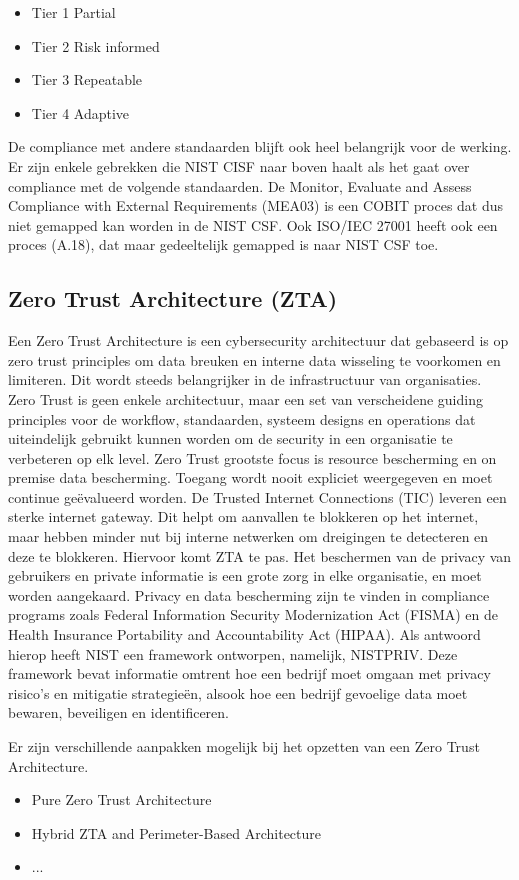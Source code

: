 \begin{itemize}
    \item Tier 1 Partial
    \item Tier 2 Risk informed
    \item Tier 3 Repeatable
    \item Tier 4 Adaptive
\end{itemize} 

De compliance met andere standaarden blijft ook heel belangrijk voor de werking. Er zijn enkele gebrekken die NIST CISF naar boven haalt als het gaat over compliance met de volgende standaarden.
De Monitor, Evaluate and Assess Compliance with External Requirements (MEA03) is een COBIT proces dat dus niet gemapped kan worden in de NIST CSF.
Ook ISO/IEC 27001 heeft ook een proces (A.18), dat maar gedeeltelijk gemapped is naar NIST CSF toe.



\subsection{Zero Trust Architecture (ZTA)}

Een Zero Trust Architecture is een cybersecurity architectuur dat gebaseerd is op zero trust principles om data breuken en interne data wisseling te voorkomen en limiteren.
Dit wordt steeds belangrijker in de infrastructuur van organisaties. Zero Trust is geen enkele architectuur, maar een set van verscheidene guiding principles voor de workflow, standaarden, systeem designs en operations dat uiteindelijk gebruikt kunnen worden om de security in een organisatie te verbeteren op elk level.
Zero Trust grootste focus is resource bescherming en on premise data bescherming. Toegang wordt nooit expliciet weergegeven en moet continue geëvalueerd worden.
De Trusted Internet Connections (TIC) leveren een sterke internet gateway. Dit helpt om aanvallen te blokkeren op het internet, maar hebben minder nut bij interne netwerken om dreigingen te detecteren en deze te blokkeren.
Hiervoor komt ZTA te pas. Het beschermen van de privacy van gebruikers en private informatie is een grote zorg in elke organisatie, en moet worden aangekaard. Privacy en data bescherming zijn te vinden in compliance programs zoals Federal Information Security Modernization Act (FISMA) en de Health Insurance Portability and Accountability Act (HIPAA).
Als antwoord hierop heeft NIST een framework ontworpen, namelijk, NISTPRIV. Deze framework bevat informatie omtrent hoe een bedrijf moet omgaan met privacy risico's en mitigatie strategieën, alsook hoe een bedrijf gevoelige data moet bewaren, beveiligen en identificeren.

Er zijn verschillende aanpakken mogelijk bij het opzetten van een Zero Trust Architecture. 

\begin{itemize}
    \item Pure Zero Trust Architecture
    \item Hybrid ZTA and Perimeter-Based Architecture
    \item ...
\end{itemize} 


